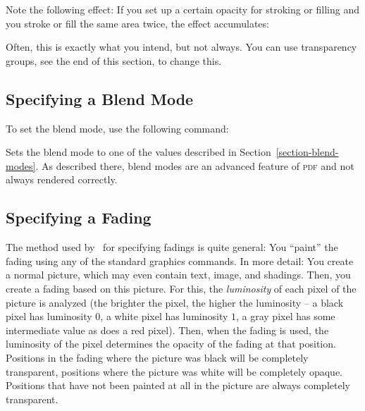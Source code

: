 Note the following effect: If you set up a certain opacity for stroking
or filling and you stroke or fill the same area twice, the effect
accumulates:

\begin{codeexample}[]
\end{codeexample}

Often, this is exactly what you intend, but not always. You can use
transparency groups, see the end of this section, to change this.


\subsection{Specifying a Blend Mode}

To set the blend mode, use the following command:

\begin{command}{\pgfsetblendmode{}}
  Sets the blend mode to one of the values described in
  Section~\ref{section-blend-modes}. As described there, blend modes
  are an advanced feature of \textsc{pdf} and not always rendered
  correctly.

  
\begin{codeexample}[]
\end{codeexample}
\end{command}


\subsection{Specifying a Fading}

The method used by \pgfname\ for specifying fadings is quite
general: You ``paint'' the fading using any of the standard graphics
commands. In more detail: You create a normal picture, which may even
contain text, image, and shadings. Then, you create a fading based on
this picture. For this, the \emph{luminosity} of each pixel of the
picture is analyzed (the brighter the pixel, the higher the luminosity
-- a black pixel has luminosity $0$, a white pixel has luminosity $1$,
a gray pixel has some intermediate value as does a red pixel). Then,
when the fading is used, the luminosity of the pixel determines the
opacity of the fading at that position. Positions in the fading where
the picture was black will be completely transparent, positions where
the picture was white will be completely opaque. Positions that have
not been painted at all in the picture are always completely
transparent.


